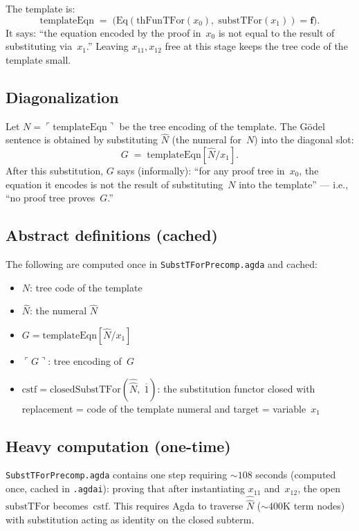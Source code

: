 \documentclass[11pt]{article}
\newcommand{\false}{\mathbf{f}}
\newcommand{\nat}[1]{\overline{#1}}
\begin{document}
The template is:
\[
  \mathrm{templateEqn} \;=\;
  \bigl(\mathrm{Eq}(\mathrm{thFunTFor}(x_0),\;
    \mathrm{substTFor}(x_1)) = \false\bigr).
\]
It says: ``the equation encoded by the proof in~$x_0$ is not equal
to the result of substituting via~$x_1$.''
Leaving $x_{11}, x_{12}$ free at this stage keeps the tree code
of the template small.

\subsection*{Diagonalization}

Let $N = \ulcorner \mathrm{templateEqn} \urcorner$ be the tree
encoding of the template.  The G\"odel sentence is obtained by
substituting $\hat{N}$ (the numeral for~$N$) into the diagonal slot:
\[
  G \;=\; \mathrm{templateEqn}[\hat{N}/x_1].
\]
After this substitution, $G$ says (informally):
``for any proof tree in~$x_0$, the equation it encodes is not the
result of substituting~$N$ into the template'' ---
i.e., ``no proof tree proves~$G$.''

\subsection*{Abstract definitions (cached)}

The following are computed once in \texttt{SubstTForPrecomp.agda}
and cached:
\begin{itemize}
\item $N$: tree code of the template
\item $\hat N$: the numeral $\widehat{N}$
\item $G = \mathrm{templateEqn}[\hat{N}/x_1]$
\item $\ulcorner G \urcorner$: tree encoding of~$G$
\item $\mathrm{cstf} = \mathrm{closedSubstTFor}(\widehat{\hat N},\;\nat{1})$:
  the substitution functor closed with replacement = code of the
  template numeral and target = variable~$x_1$
\end{itemize}

\subsection*{Heavy computation (one-time)}

\texttt{SubstTForPrecomp.agda} contains one step requiring
${\sim}108$ seconds (computed once, cached in \texttt{.agdai}):
proving that after instantiating $x_{11}$ and~$x_{12}$, the open
$\mathrm{substTFor}$ becomes~$\mathrm{cstf}$.
This requires Agda to traverse $\widehat{\hat{N}}$
(${\sim}400$K term nodes) with substitution acting as identity
on the closed subterm.
\end{document}
